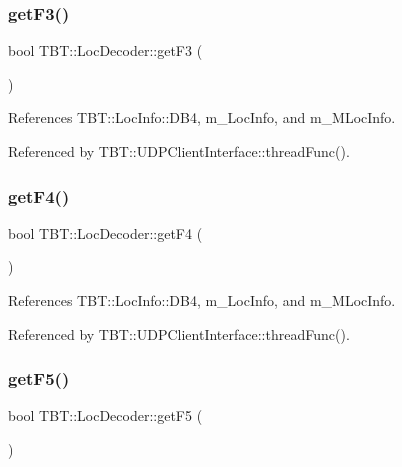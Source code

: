 \subsubsection{\texorpdfstring{get\+F3()}{getF3()}}
{\footnotesize\ttfamily bool T\+B\+T\+::\+Loc\+Decoder\+::get\+F3 (\begin{DoxyParamCaption}{ }\end{DoxyParamCaption})\hspace{0.3cm}{\ttfamily [inline]}}



References T\+B\+T\+::\+Loc\+Info\+::\+D\+B4, m\+\_\+\+Loc\+Info, and m\+\_\+\+M\+Loc\+Info.



Referenced by T\+B\+T\+::\+U\+D\+P\+Client\+Interface\+::thread\+Func().

\mbox{\label{classTBT_1_1LocDecoder_a2af90878d4f8f1f3b64f393519ac8f7a_a2af90878d4f8f1f3b64f393519ac8f7a}} 
\subsubsection{\texorpdfstring{get\+F4()}{getF4()}}
{\footnotesize\ttfamily bool T\+B\+T\+::\+Loc\+Decoder\+::get\+F4 (\begin{DoxyParamCaption}{ }\end{DoxyParamCaption})\hspace{0.3cm}{\ttfamily [inline]}}



References T\+B\+T\+::\+Loc\+Info\+::\+D\+B4, m\+\_\+\+Loc\+Info, and m\+\_\+\+M\+Loc\+Info.



Referenced by T\+B\+T\+::\+U\+D\+P\+Client\+Interface\+::thread\+Func().

\mbox{\label{classTBT_1_1LocDecoder_a25b602fa8075cd6eb22bb936d9e957c7_a25b602fa8075cd6eb22bb936d9e957c7}} 
\subsubsection{\texorpdfstring{get\+F5()}{getF5()}}
{\footnotesize\ttfamily bool T\+B\+T\+::\+Loc\+Decoder\+::get\+F5 (\begin{DoxyParamCaption}{ }\end{DoxyParamCaption})\hspace{0.3cm}{\ttfamily [inline]}}



